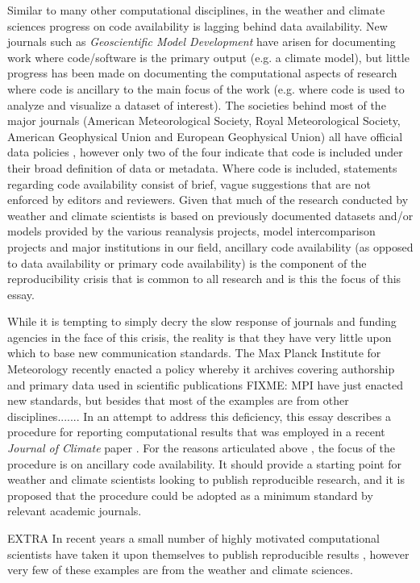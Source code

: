 Similar to many other computational disciplines, in the weather and climate sciences progress on code availability is lagging behind data availability. New journals such as \textit{Geoscientific Model Development} have arisen for documenting work where code/software is the primary output (e.g. a climate model), but little progress has been made on documenting the computational aspects of research where code is ancillary to the main focus of the work (e.g. where code is used to analyze and visualize a dataset of interest). The societies behind most of the major journals (American Meteorological Society, Royal Meteorological Society, American Geophysical Union and European Geophysical Union) all have official data policies \citep[e.g.][]{Mayernik2015}, however only two of the four indicate that code is included under their broad definition of data or metadata. Where code is included, statements regarding code availability consist of brief, vague suggestions that are not enforced by editors and reviewers. Given that much of the research conducted by weather and climate scientists is based on previously documented datasets and/or models provided by the various reanalysis projects, model intercomparison projects and major institutions in our field, ancillary code availability (as opposed to data availability or primary code availability) is the component of the reproducibility crisis that is common to all research and is this the focus of this essay.

While it is tempting to simply decry the slow response of journals and funding agencies in the face of this crisis, the reality is that they have very little upon which to base new communication standards. The Max Planck Institute for Meteorology recently enacted a policy \citep{Stevens2015a} whereby it archives  covering authorship and primary data used in scientific publications FIXME: MPI have just enacted new standards, but besides that most of the examples are from other disciplines....... In an attempt to address this deficiency, this essay describes a procedure for reporting computational results that was employed in a recent \textit{Journal of Climate} paper \citep[][hereafter referred to as IS2015]{IrvingSimmonds2015}. For the reasons articulated above \citep[and the fact that data availability has already been addressed in a recent BAMS essay;][]{Mayernik2015a}, the focus of the procedure is on ancillary code availability. It should provide a starting point for weather and climate scientists looking to publish reproducible research, and it is proposed that the procedure could be adopted as a minimum standard by relevant academic journals.

EXTRA
In recent years a small number of highly motivated computational scientists have taken it upon themselves to publish reproducible results \citep[e.g.][]{Ketcheson2012,Crooks2014,Schmitt2015}, however very few of these examples are from the weather and climate sciences.
  
  
  
  
  
  
  
  
  
  
  
  
  
  